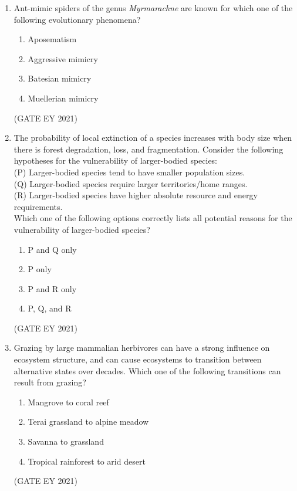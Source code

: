 \documentclass[journal]{IEEEtran}
\begin{document}
\begin{enumerate}
    \item Ant-mimic spiders of the genus \textit{Myrmarachne} are known for which one of the following evolutionary phenomena?
    \begin{multicols}{2}
    \begin{enumerate}
        \item Aposematism
        \item Aggressive mimicry
        \item Batesian mimicry
        \item Muellerian mimicry
    \end{enumerate}
    \end{multicols}
    \hfill{(GATE EY 2021)}

    \item The probability of local extinction of a species increases with body size when there is forest degradation, loss, and fragmentation. Consider the following hypotheses for the vulnerability of larger-bodied species: \\
    (P) Larger-bodied species tend to have smaller population sizes. \\
    (Q) Larger-bodied species require larger territories/home ranges. \\
    (R) Larger-bodied species have higher absolute resource and energy requirements. \\
    Which one of the following options correctly lists all potential reasons for the vulnerability of larger-bodied species?
    \begin{multicols}{2}
    \begin{enumerate}
        \item P and Q only
        \item P only
        \item P and R only
        \item P, Q, and R
    \end{enumerate}
    \end{multicols}
    \hfill{(GATE EY 2021)}

    \item Grazing by large mammalian herbivores can have a strong influence on ecosystem structure, and can cause ecosystems to transition between alternative states over decades. Which one of the following transitions can result from grazing?
    \begin{multicols}{2}
    \begin{enumerate}
        \item Mangrove to coral reef
        \item Terai grassland to alpine meadow
        \item Savanna to grassland
        \item Tropical rainforest to arid desert
    \end{enumerate}
    \end{multicols}
    \hfill{(GATE EY 2021)}


\end{enumerate}
\end{document}
